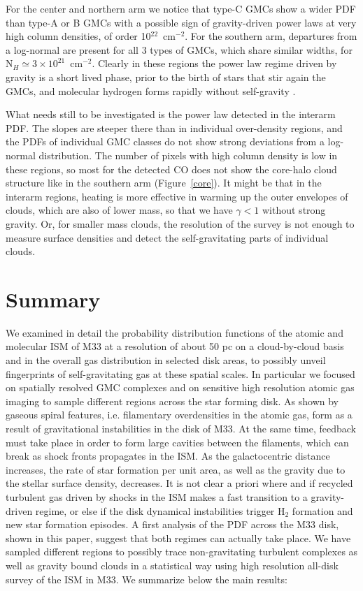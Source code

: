 \documentclass{aa}
\begin{document}
For the center and northern arm we notice that type-C GMCs show a wider PDF than
type-A or B GMCs with a possible sign of gravity-driven power laws at very high
column densities, of order 10$^{22}$~cm$^{-2}$. For the southern arm, departures
from a log-normal are present for all 3 types of GMCs, which share similar widths,
for N$_H\simeq 3\times 10^{21}$~cm$^{-2}$. Clearly in these regions the power law
regime driven by gravity is a short lived phase, prior to the birth of stars that
stir again the GMCs, and molecular hydrogen forms rapidly without self-gravity
\citep{2008MNRAS.389.1097D}.

What needs still to be investigated is the power law detected in the interarm PDF.
The slopes are steeper there than in individual over-density regions, and the PDFs
of individual GMC classes do not show strong deviations from a log-normal
distribution. The number of pixels with high column density is low in these
regions, so most for the detected CO does not show the core-halo cloud structure
like in the southern arm (Figure~\ref{core}). It might be that in the interarm
regions, heating is more effective in warming up the outer envelopes of clouds,
which are also of lower mass, so that we have  $\gamma < 1$ without strong
gravity. Or, for smaller mass clouds, the resolution of the survey is not enough
to measure  surface densities and  detect the  self-gravitating parts of individual clouds.


\section{Summary}
\label{sum}

We examined in detail the probability distribution functions of the atomic and molecular ISM of M33
at a resolution of about 50 pc on a cloud-by-cloud basis and in  the overall gas  distribution
in selected disk areas, to possibly unveil fingerprints of self-gravitating gas at these spatial scales.
In particular we focused on spatially resolved GMC complexes and on
sensitive high resolution atomic gas imaging to sample different regions across the star forming disk.
As shown by \citet{2018MNRAS.tmp.1241D}  gaseous spiral features, i.e. filamentary
overdensities in the atomic gas, form as a result of gravitational instabilities
in the  disk of M33.  At the same time, feedback must take place in order to form 
large cavities between the filaments, which can break  as  shock fronts propagates
in the ISM.
As the galactocentric distance increases, the rate of star formation per unit
area, as well as the gravity due to the stellar surface density, decreases. It is
not clear a priori where and if recycled turbulent gas driven by shocks in the ISM
makes a fast transition to a gravity-driven regime, or else if the disk
dynamical instabilities trigger H$_2$ formation and new star formation episodes. A
first analysis of the PDF across the M33 disk, shown in this paper, suggest that
both regimes can actually take place. 
We have sampled different regions to possibly trace
non-gravitating turbulent complexes as well as gravity bound clouds in a
statistical way using high resolution all-disk survey of the ISM in M33.
We summarize below the main results:
\end{document}
